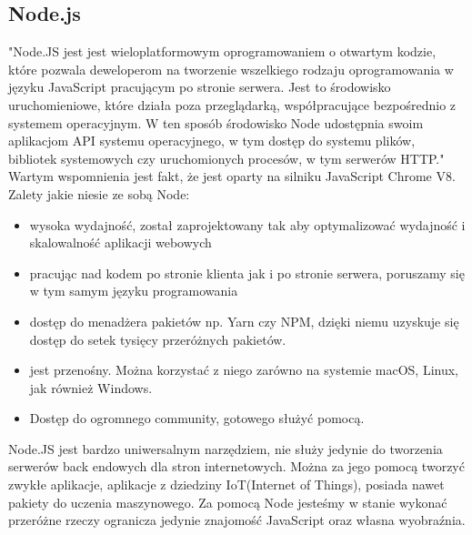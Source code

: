 \documentclass[12pt]{article}
\begin{document}
\begin{sloppypar}
{  \subsection{Node.js}
  {
    "Node.JS jest jest wieloplatformowym oprogramowaniem o otwartym kodzie, 
    które pozwala deweloperom na tworzenie wszelkiego rodzaju oprogramowania w języku JavaScript pracującym po stronie serwera. 
    Jest to środowisko uruchomieniowe, które działa poza przeglądarką, współpracujące bezpośrednio z systemem operacyjnym. 
    W ten sposób środowisko Node udostępnia swoim aplikacjom API systemu operacyjnego, w tym dostęp do systemu plików, bibliotek systemowych czy uruchomionych procesów, 
    w tym serwerów HTTP."\cite{mozilla-node} Wartym wspomnienia jest fakt, że jest oparty na silniku JavaScript Chrome V8.\\ 
    Zalety jakie niesie ze sobą Node:
    \begin{itemize}
      \item wysoka wydajność, został zaprojektowany tak aby optymalizować wydajność i skalowalność aplikacji webowych
      \item pracując nad kodem po stronie klienta jak i po stronie serwera, poruszamy się w tym samym języku programowania
      \item dostęp do menadżera pakietów np. Yarn czy NPM, dzięki niemu uzyskuje się dostęp do setek tysięcy przeróżnych pakietów.
      \item jest przenośny. Można korzystać z niego zarówno na systemie macOS, Linux, jak również Windows.
      \item Dostęp do ogromnego community, gotowego służyć pomocą.
    \end{itemize}
    Node.JS jest bardzo uniwersalnym narzędziem, nie służy jedynie do tworzenia serwerów back endowych dla stron internetowych. Można za jego pomocą tworzyć 
    zwykłe aplikacje, aplikacje z dziedziny IoT(Internet of Things), posiada nawet pakiety do uczenia maszynowego. Za pomocą Node jesteśmy w stanie 
    wykonać przeróżne rzeczy ogranicza jedynie znajomość JavaScript oraz własna wyobraźnia. \\
    \begin{figure}[H]
      \centering

\end{figure}}}
\end{sloppypar}
\end{document}
